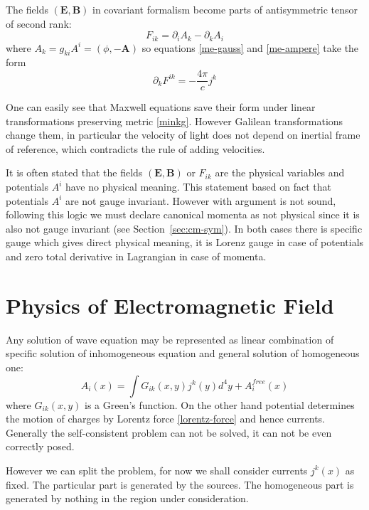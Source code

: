 The fields $ (\bm E,\bm B) $ in covariant formalism
become parts of antisymmetric tensor of second rank:
\begin{equation}
   \label {ebc}
    F_{i k}=\partial_i A_k-\partial_k A_i
\end{equation}
where $ A_k=g_{k i} A^i=(\phi,-\bm A) $ so equations \eqref{me-gauss}
and \eqref{me-ampere} take the form
\begin{equation}
   \label {mec}
    \partial_k F^{i k}=-\frac{4 \pi}{c} j^k
\end{equation}

One can easily see that Maxwell equations save their form
under linear transformations preserving metric \eqref{minkg}.
However Galilean transformations change them, in particular
the velocity of light does not depend on inertial frame of
reference, which contradicts the rule of adding velocities.


It is often stated that the fields $ (\bm E,\bm B) $ or
$ F_{i k} $ are the physical variables and potentials
$A^i$ have no physical meaning. This statement based
on fact that potentials $ A^i $ are not gauge invariant.
However with argument is not sound, following this logic
we must declare canonical momenta as not physical since
it  is also not gauge invariant (see Section~\ref{sec:cm-sym}).
In both cases there is specific gauge which gives direct physical
meaning, it is Lorenz gauge in case of potentials and
zero total derivative in Lagrangian in case of momenta.


\section{Physics of Electromagnetic Field}
\label{sec:ed-phys-em}

Any solution of wave equation may be represented as linear combination of specific
solution of inhomogeneous equation and general solution of homogeneous one:
\begin{equation}
   \label {we-sol}
    A_i(x)=\int G_{ik}(x,y)j^k(y) d^4 y +A_i^{free} (x)
\end{equation}
where $  G_{ik}(x,y)$ is a Green's function.
On the other hand potential determines the motion of charges by Lorentz force \eqref{lorentz-force}
and hence currents. Generally the self-consistent problem can not be solved,
it can not be even correctly posed.

However we can split the problem, for now we shall consider
currents $ j^k(x) $ as fixed.
The particular part is generated by the sources. The homogeneous part is
generated by nothing in the region under consideration.


